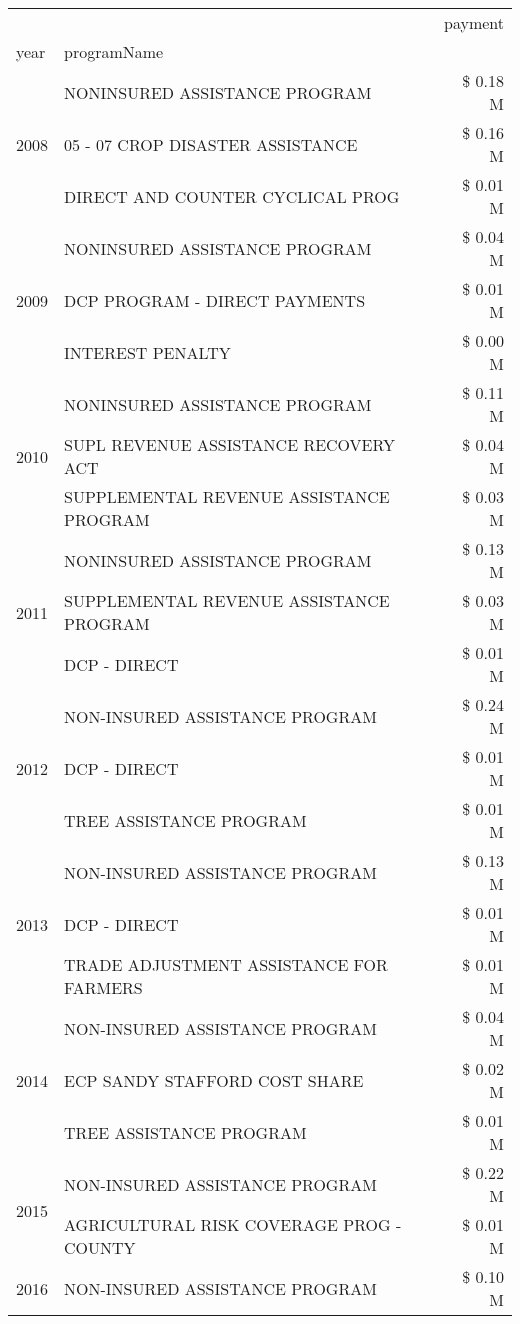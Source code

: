 \begin{tabular}{llr}
\toprule
 &  & payment \\
year & programName &  \\
\midrule
\multirow[t]{3}{*}{2008} & NONINSURED ASSISTANCE PROGRAM & \$ 0.18 M \\
 & 05 - 07 CROP DISASTER ASSISTANCE & \$ 0.16 M \\
 & DIRECT AND COUNTER CYCLICAL PROG & \$ 0.01 M \\
\cline{1-3}
\multirow[t]{3}{*}{2009} & NONINSURED ASSISTANCE PROGRAM & \$ 0.04 M \\
 & DCP PROGRAM - DIRECT PAYMENTS & \$ 0.01 M \\
 & INTEREST PENALTY & \$ 0.00 M \\
\cline{1-3}
\multirow[t]{3}{*}{2010} & NONINSURED ASSISTANCE PROGRAM & \$ 0.11 M \\
 & SUPL REVENUE ASSISTANCE RECOVERY ACT & \$ 0.04 M \\
 & SUPPLEMENTAL REVENUE ASSISTANCE PROGRAM & \$ 0.03 M \\
\cline{1-3}
\multirow[t]{3}{*}{2011} & NONINSURED ASSISTANCE PROGRAM & \$ 0.13 M \\
 & SUPPLEMENTAL REVENUE ASSISTANCE PROGRAM & \$ 0.03 M \\
 & DCP - DIRECT & \$ 0.01 M \\
\cline{1-3}
\multirow[t]{3}{*}{2012} & NON-INSURED ASSISTANCE PROGRAM & \$ 0.24 M \\
 & DCP - DIRECT & \$ 0.01 M \\
 & TREE ASSISTANCE PROGRAM & \$ 0.01 M \\
\cline{1-3}
\multirow[t]{3}{*}{2013} & NON-INSURED ASSISTANCE PROGRAM & \$ 0.13 M \\
 & DCP - DIRECT & \$ 0.01 M \\
 & TRADE ADJUSTMENT ASSISTANCE FOR FARMERS & \$ 0.01 M \\
\cline{1-3}
\multirow[t]{3}{*}{2014} & NON-INSURED ASSISTANCE PROGRAM & \$ 0.04 M \\
 & ECP SANDY STAFFORD COST SHARE & \$ 0.02 M \\
 & TREE ASSISTANCE PROGRAM & \$ 0.01 M \\
\cline{1-3}
\multirow[t]{2}{*}{2015} & NON-INSURED ASSISTANCE PROGRAM & \$ 0.22 M \\
 & AGRICULTURAL RISK COVERAGE PROG - COUNTY & \$ 0.01 M \\
\cline{1-3}
\multirow[t]{3}{*}{2016} & NON-INSURED ASSISTANCE PROGRAM & \$ 0.10 M \\

\end{tabular}

